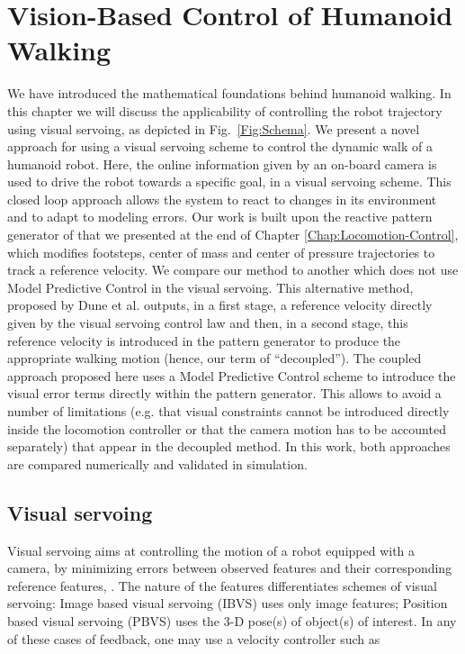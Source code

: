 \chapter{Vision-Based Control of Humanoid Walking} 
\label{Chap:Visual-Servoing}

We have introduced the mathematical foundations behind humanoid walking. In this chapter we will discuss the applicability of controlling the robot trajectory using visual servoing, as depicted in Fig.~\ref{Fig:Schema}. We present a novel approach for using a visual servoing scheme to control the dynamic walk of a humanoid robot. Here, the online information given by an on-board camera is used to drive the robot towards a specific goal, in a visual servoing scheme. This closed loop approach allows the system to react to changes in its environment and to adapt to modeling errors. Our work is built upon the reactive pattern generator of \citep{HerdtAR2010} that we presented at the end of Chapter \ref{Chap:Locomotion-Control}, which modifies footsteps, center of mass and center of pressure trajectories to track a reference velocity. We compare our method to another which does not use Model Predictive Control in the visual servoing. This alternative method, proposed by Dune et al. \citep{DuneIROS2010} outputs, in a first stage, a reference velocity directly given by the visual servoing control law and then, in a second stage, this reference velocity is introduced in the pattern generator to produce the appropriate walking motion (hence, our term of ``decoupled''). The coupled approach proposed here uses a Model Predictive Control scheme to introduce the visual error terms directly within the pattern generator. This allows to avoid a number of limitations (e.g. that visual constraints cannot be introduced directly inside the locomotion controller or that the camera motion has to be accounted separately) that appear in the decoupled method.  In this work, both approaches are compared numerically and validated in simulation.

\section{ Visual servoing}

Visual servoing aims at controlling the motion of a robot equipped with a camera, by minimizing errors between observed features and their corresponding reference features, \citep{ChaumetteRAM2006, ChaumetteRAM2007}. The nature of the features differentiates schemes of visual servoing: Image based visual servoing (IBVS) uses only image features; Position based visual servoing (PBVS) uses the 3-D pose(s) of object(s) of interest. In any of these cases of feedback, one may use a velocity controller such as

